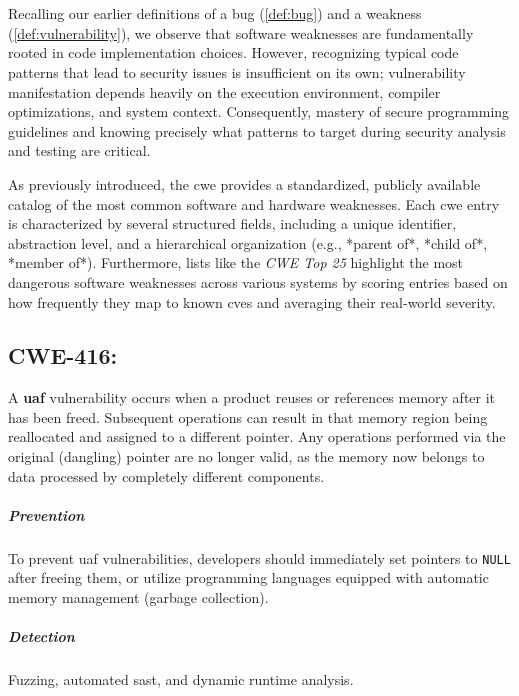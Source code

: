 \chapter{}
Recalling our earlier definitions of a bug (\cref{def:bug}) and a weakness (\cref{def:vulnerability}), we observe that software weaknesses are fundamentally rooted in code implementation choices. However, recognizing typical code patterns that lead to security issues is insufficient on its own; vulnerability manifestation depends heavily on the execution environment, compiler optimizations, and system context. Consequently, mastery of secure programming guidelines and knowing precisely what patterns to target during security analysis and testing are critical.

\noindent As previously introduced, the \gls{cwe} provides a standardized, publicly available catalog of the most common software and hardware weaknesses. Each \gls{cwe} entry is characterized by several structured fields, including a unique identifier, abstraction level, and a hierarchical organization (e.g., *parent of*, *child of*, *member of*). Furthermore, lists like the \textit{CWE Top 25} highlight the most dangerous software weaknesses across various systems by scoring entries based on how frequently they map to known \glspl{cve} and averaging their real-world severity.

\section{CWE-416:}
A \textbf{\gls{uaf}} vulnerability occurs when a product reuses or references memory after it has been freed. Subsequent operations can result in that memory region being reallocated and assigned to a different pointer. Any operations performed via the original (dangling) pointer are no longer valid, as the memory now belongs to data processed by completely different components.

\paragraph{Prevention} To prevent \gls{uaf} vulnerabilities, developers should immediately set pointers to \texttt{NULL} after freeing them, or utilize programming languages equipped with automatic memory management (garbage collection).

\paragraph{Detection} Fuzzing, automated \gls{sast}, and dynamic runtime analysis.

